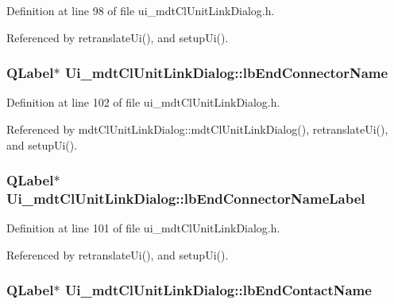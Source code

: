 Definition at line 98 of file ui\-\_\-mdt\-Cl\-Unit\-Link\-Dialog.\-h.



Referenced by retranslate\-Ui(), and setup\-Ui().

\hypertarget{class_ui__mdt_cl_unit_link_dialog_aa0d04d3f41a73baa6422f705aa1ca317}{
\subsubsection[{lb\-End\-Connector\-Name}]{\setlength{\rightskip}{0pt plus 5cm}Q\-Label$\ast$ Ui\-\_\-mdt\-Cl\-Unit\-Link\-Dialog\-::lb\-End\-Connector\-Name}}\label{class_ui__mdt_cl_unit_link_dialog_aa0d04d3f41a73baa6422f705aa1ca317}


Definition at line 102 of file ui\-\_\-mdt\-Cl\-Unit\-Link\-Dialog.\-h.



Referenced by mdt\-Cl\-Unit\-Link\-Dialog\-::mdt\-Cl\-Unit\-Link\-Dialog(), retranslate\-Ui(), and setup\-Ui().

\hypertarget{class_ui__mdt_cl_unit_link_dialog_a4b95be3f2e905844739ad3cf59106378}{
\subsubsection[{lb\-End\-Connector\-Name\-Label}]{\setlength{\rightskip}{0pt plus 5cm}Q\-Label$\ast$ Ui\-\_\-mdt\-Cl\-Unit\-Link\-Dialog\-::lb\-End\-Connector\-Name\-Label}}\label{class_ui__mdt_cl_unit_link_dialog_a4b95be3f2e905844739ad3cf59106378}


Definition at line 101 of file ui\-\_\-mdt\-Cl\-Unit\-Link\-Dialog.\-h.



Referenced by retranslate\-Ui(), and setup\-Ui().

\hypertarget{class_ui__mdt_cl_unit_link_dialog_ab4eef76ab71b7baf7700a88e75ad50f9}{
\subsubsection[{lb\-End\-Contact\-Name}]{\setlength{\rightskip}{0pt plus 5cm}Q\-Label$\ast$ Ui\-\_\-mdt\-Cl\-Unit\-Link\-Dialog\-::lb\-End\-Contact\-Name}}\label{class_ui__mdt_cl_unit_link_dialog_ab4eef76ab71b7baf7700a88e75ad50f9}


